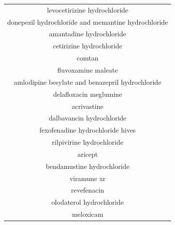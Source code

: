 \documentclass{article}
\newcommand{\lgc}[1]{\cellcolor[gray]{0.85}#1}
\begin{document}
\begin{table}[p]
\begin{tabular}[t]{c}
levocetirizine hydrochloride \\
\lgc{donepezil hydrochloride and memantine hydrochloride\cite{rejdak2020adamantanes,cimolai2020potentially}} \\
\lgc{amantadine hydrochloride\cite{rejdak2020adamantanes,cimolai2020potentially}} \\
cetirizine hydrochloride \\
comtan \\
\lgc{fluvoxamine maleate\cite{stopcovid}} \\
\lgc{amlodipine besylate and benazepril hydrochloride\cite{Zhang2020.04.08.20047134}} \\
delafloxacin meglumine \\
acrivastine \\
dalbavancin hydrochloride \\
\lgc{fexofenadine hydrochloride hives\cite{Farag2020}} \\
rilpivirine hydrochloride \\
aricept \\
bendamustine hydrochloride \\
viramune xr \\
revefenacin \\
olodaterol hydrochloride \\
meloxicam \\
\hline
\end{tabular}
\end{table}
\end{document}
